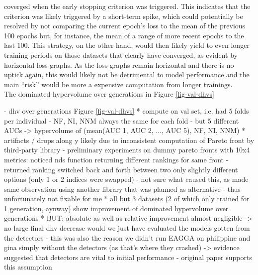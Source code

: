 \documentclass[twoside,11pt]{article}
\begin{document}
coverged when the early stopping criterion was triggered.
This indicates that the criterion was likely triggered by a short-term spike, which could potentially be resolved by not comparing the current epoch's loss
to the mean of the previous 100 epochs but, for instance, the mean of a range of more recent epochs to the last 100.
This strategy, on the other hand, would then likely yield to even longer training periods on those datasets that clearly have converged, as evident by
horizontal loss graphs.
As the loss graphs remain horizontal and there is no uptick again, this would likely not be detrimental to model performance and the main ``risk'' would be
more a expensive computation from longer trainings.
\\
The dominated hypervolume over generations in Figure \ref{fig-val-dhvs}



- dhv over generations Figure \ref{fig-val-dhvs}
  * compute on val set, i.e. had 5 folds per individual
    - NF, NI, NNM always the same for each fold
    - but 5 different AUCs
    -> hypervolume of (mean(AUC 1, AUC 2, ..., AUC 5), NF, NI, NNM)
  * artifacts / drops along y likely due to inconsistent computation of Pareto front by third-party library
    - preliminary experiments on dummy pareto fronts with 10x4 metrics: noticed nds function returning different rankings for same front
    - returned ranking switched back and forth between two only slightly different options (only 1 or 2 indices were swapped)
    - not sure what caused this, as made same observation using another library that was planned as alternative
    - thus unfortunately not fixable for me
  * all but 3 datasets (2 of which only trained for 1 generation, aynway) show improvement of dominated hypervolume over generations
  * BUT: absolute as well as relative improvement almost negligible -> no large final dhv decrease would we just have evaluated the models gotten from the detectors
    - this was also the reason we didn't run EAGGA on philippine and gina simply without the detectors (as that's where they crashed) -> evidence suggested that detectors are vital to initial performance
    - original paper supports this assumption \citep[Fig. 4, p. 545]{EAGGA}
\end{document}
